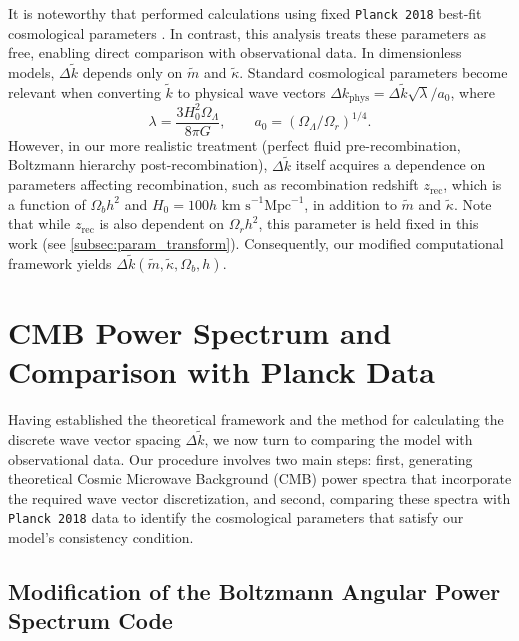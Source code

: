 \documentclass[%
 reprint,
 amsmath,amssymb,
 prd, %
]{revtex4-2}
\begin{document}
It is noteworthy that \cite{2022PhRvD.105l3508P} performed calculations using fixed \texttt{Planck 2018} best-fit cosmological parameters \cite{2020A&A...641A...6P}. In contrast, this analysis treats these parameters as free, enabling direct comparison with observational data. %
In dimensionless models, $\Delta\tilde k$ depends only on $\tilde m$ and $\tilde \kappa$. Standard cosmological parameters become relevant when converting $\tilde k$ to physical wave vectors $\Delta k_{\mathrm{phys}}= \Delta\tilde k\sqrt{\lambda}/a_0$, where
\[ \lambda = \frac{3H_0^2\Omega_\Lambda}{8\pi G %
}, \qquad a_0=(\Omega_\Lambda/\Omega_r)^{1/4}. \]
However, in our more realistic treatment (perfect fluid pre-recombination, Boltzmann hierarchy post-recombination), $\Delta\tilde k$ itself acquires a dependence on parameters affecting recombination, such as recombination redshift $z_{\mathrm{rec}}$, which is a function of $\Omega_b h^2$ and $H_0 = 100h \text{ km s}^{-1}\text{Mpc}^{-1}$, in addition to $\tilde m$ and $\tilde \kappa$. Note that while $z_{\mathrm{rec}}$ is also dependent on $\Omega_rh^2$, this parameter is held fixed in this work (see \ref{subsec:param_transform}). 
Consequently, our modified computational framework yields $\Delta\tilde k(\tilde m, \tilde \kappa, \Omega_b, h)$. %


\section{CMB Power Spectrum and Comparison with Planck Data}\label{sec:CMB}

Having established the theoretical framework and the method for calculating the discrete wave vector spacing $\Delta\tilde{k}$, we now turn to comparing the model with observational data. Our procedure involves two main steps: first, generating theoretical Cosmic Microwave Background (CMB) power spectra that incorporate the required wave vector discretization, and second, comparing these spectra with \texttt{Planck 2018} data to identify the cosmological parameters that satisfy our model's consistency condition.

\subsection{Modification of the Boltzmann Angular Power Spectrum Code}\label{subsec:modify_CLASS}
\end{document}
